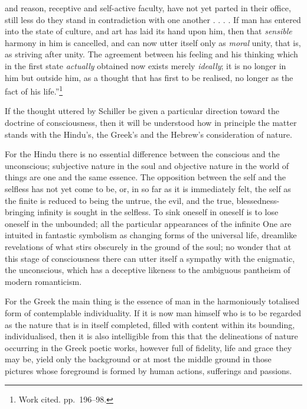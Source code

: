 \documentclass[12pt,a4paper]{book}
\begin{document}
and reason, receptive and self-active faculty, have not yet parted in their office, still less do they stand in
contradiction with one another . . . . If man has entered into the state of culture, and art has laid its hand upon him,
then that \emph{sensible} harmony in him is cancelled, and can now utter itself only as \emph{moral} unity, that is, as
striving after unity. The agreement between his feeling and his thinking which in the first state \emph{actually}
obtained now exists merely \emph{ideally}; it is no longer in him but outside him, as a thought that has first to be
realised, no longer as the fact of his life.''\footnote{Work cited. pp.\ 196--98.}

If the thought uttered by Schiller be given a particular direction toward the doctrine of consciousness, then it will be
understood how in principle the matter stands with the Hindu's, the Greek's and the Hebrew's consideration of nature.

For the Hindu there is no essential difference between the conscious and the unconscious; subjective nature in the soul
and objective nature in the world of things are one and the same essence. The opposition between the self and the
selfless has not yet come to be, or, in so far as it is immediately felt, the self as the finite is reduced to being the
untrue, the evil, and the true, blessedness-bringing infinity is sought in the selfless. To sink oneself in oneself is to
lose oneself in the unbounded; all the particular appearances of the infinite One are intuited in fantastic symbolism as
changing forms of the universal life, dreamlike revelations of what stirs obscurely in the ground of the soul; no wonder
that at this stage of consciousness there can utter itself a sympathy with the enigmatic, the unconscious, which has a
deceptive likeness to the ambiguous pantheism of modern romanticism.

For the Greek the main thing is the essence of man in the harmoniously totalised form of contemplable individuality. If
it is now man himself who is to be regarded as the nature that is in itself completed, filled with content within its
bounding, individualised, then it is also intelligible from this that the delineations of nature occurring in the Greek
poetic works, however full of fidelity, life and grace they may be, yield only the background or at most the middle
ground in those pictures whose foreground is formed by human actions, sufferings and passions.
\end{document}
